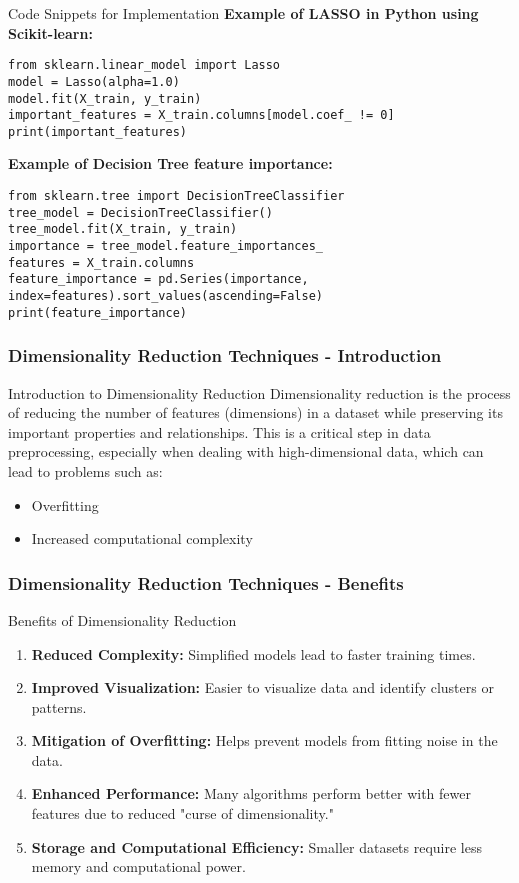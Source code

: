 \documentclass[aspectratio=169]{beamer}
\begin{document}
\begin{frame}[fragile]{Code Snippets for Implementation}
    \textbf{Example of LASSO in Python using Scikit-learn:}
    \begin{lstlisting}
from sklearn.linear_model import Lasso
model = Lasso(alpha=1.0)
model.fit(X_train, y_train)
important_features = X_train.columns[model.coef_ != 0]
print(important_features)
    \end{lstlisting}

    \textbf{Example of Decision Tree feature importance:}
    \begin{lstlisting}
from sklearn.tree import DecisionTreeClassifier
tree_model = DecisionTreeClassifier()
tree_model.fit(X_train, y_train)
importance = tree_model.feature_importances_
features = X_train.columns
feature_importance = pd.Series(importance, index=features).sort_values(ascending=False)
print(feature_importance)
    \end{lstlisting}
\end{frame}

\begin{frame}[fragile]
    \frametitle{Dimensionality Reduction Techniques - Introduction}
    \begin{block}{Introduction to Dimensionality Reduction}
        Dimensionality reduction is the process of reducing the number of features (dimensions) in a dataset while preserving its important properties and relationships. This is a critical step in data preprocessing, especially when dealing with high-dimensional data, which can lead to problems such as:
        \begin{itemize}
            \item Overfitting
            \item Increased computational complexity
        \end{itemize}
    \end{block}
\end{frame}

\begin{frame}[fragile]
    \frametitle{Dimensionality Reduction Techniques - Benefits}
    \begin{block}{Benefits of Dimensionality Reduction}
        \begin{enumerate}
            \item \textbf{Reduced Complexity:} Simplified models lead to faster training times.
            \item \textbf{Improved Visualization:} Easier to visualize data and identify clusters or patterns.
            \item \textbf{Mitigation of Overfitting:} Helps prevent models from fitting noise in the data.
            \item \textbf{Enhanced Performance:} Many algorithms perform better with fewer features due to reduced "curse of dimensionality."
            \item \textbf{Storage and Computational Efficiency:} Smaller datasets require less memory and computational power.
        \end{enumerate}
    \end{block}
\end{frame}
\end{document}

